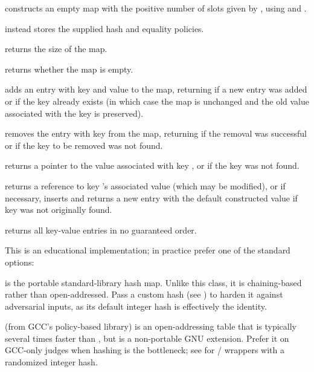 \begin{compactitem}
  \item {} constructs an empty map with the positive number of slots given by , using  and .
  \item {} instead stores the supplied hash and equality policies.
  \item {} returns the size of the map.
  \item {} returns whether the map is empty.
  \item {} adds an entry with key  and value  to the map, returning  if a new entry was added or  if the key already exists (in which case the map is unchanged and the old value associated with the key is preserved).
  \item {} removes the entry with key  from the map, returning  if the removal was successful or  if the key to be removed was not found.
  \item {} returns a pointer to the value associated with key , or  if the key was not found.
  \item {} returns a reference to key 's associated value (which may be modified), or if necessary, inserts and returns a new entry with the default constructed value if key  was not originally found.
  \item {} returns all key-value entries in no guaranteed order.
\end{compactitem}

This is an educational implementation; in practice prefer one of the standard options:

\begin{compactitem}
  \item {} is the portable standard-library hash map. Unlike this class, it is chaining-based rather than open-addressed. Pass a custom hash (see ) to harden it against adversarial inputs, as its default integer hash is effectively the identity.
  \item {} (from GCC's policy-based library) is an open-addressing table that is typically several times faster than , but is a non-portable GNU extension. Prefer it on GCC-only judges when hashing is the bottleneck; see  for / wrappers with a randomized integer hash.
\end{compactitem}

